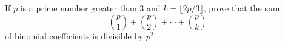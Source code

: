If $p$ is a prime number greater than 3 and $k = \lfloor 2p/3
\rfloor$, prove that the sum
\[
\binom p1 + \binom p2 + \cdots + \binom pk
\]
of binomial coefficients is divisible by $p^2$.
